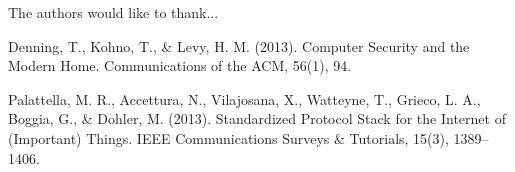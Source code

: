 \documentclass[journal]{IEEEtran}
\begin{document}
The authors would like to thank...



%
%
%
\begin{thebibliography}{1}

Denning, T., Kohno, T., \& Levy, H. M. (2013). Computer Security and the Modern Home. Communications of the ACM, 56(1), 94. 


Palattella, M. R., Accettura, N., Vilajosana, X., Watteyne, T., Grieco, L. A., Boggia, G., \& Dohler, M. (2013). Standardized Protocol Stack for the Internet of (Important) Things. IEEE Communications Surveys \& Tutorials, 15(3), 1389–1406. 

\end{thebibliography}



\end{document}
